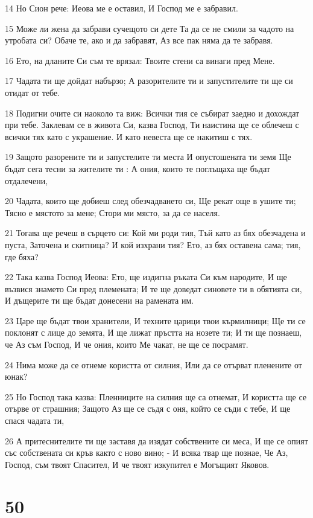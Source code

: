 \par 14 Но Сион рече: Иеова ме е оставил, И Господ ме е забравил.
\par 15 Може ли жена да забрави сучещото си дете Та да се не смили за чадото на утробата си? Обаче те, ако и да забравят, Аз все пак няма да те забравя.
\par 16 Ето, на дланите Си съм те врязал: Твоите стени са винаги пред Мене.
\par 17 Чадата ти ще дойдат набързо; А разорителите ти и запустителите ти ще си отидат от тебе.
\par 18 Подигни очите си наоколо та виж: Всички тия се събират заедно и дохождат при тебе. Заклевам се в живота Си, казва Господ, Ти наистина ще се облечеш с всички тях като с украшение. И като невеста ще се накитиш с тях.
\par 19 Защото разорените ти и запустелите ти места И опустошената ти земя Ще бъдат сега тесни за жителите ти : А ония, които те поглъщаха ще бъдат отдалечени,
\par 20 Чадата, които ще добиеш след обезчадването си, Ще рекат още в ушите ти; Тясно е мястото за мене; Стори ми място, за да се населя.
\par 21 Тогава ще речеш в сърцето си: Кой ми роди тия, Тъй като аз бях обезчадена и пуста, Заточена и скитница? И кой изхрани тия? Ето, аз бях оставена сама; тия, где бяха?
\par 22 Така казва Господ Иеова: Ето, ще издигна ръката Си към народите, И ще възвися знамето Си пред племената; И те ще доведат синовете ти в обятията си, И дъщерите ти ще бъдат донесени на рамената им.
\par 23 Царе ще бъдат твои хранители, И техните царици твои кърмилници; Ще ти се поклонят с лице до земята, И ще лижат пръстта на нозете ти; И ти ще познаеш, че Аз съм Господ, И че ония, които Ме чакат, не ще се посрамят.
\par 24 Нима може да се отнеме користта от силния, Или да се отърват пленените от юнак?
\par 25 Но Господ така казва: Пленниците на силния ще са отнемат, И користта ще се отърве от страшния; Защото Аз ще се съдя с оня, който се съди с тебе, И ще спася чадата ти,
\par 26 А притеснителите ти ще заставя да изядат собствените си меса, И ще се опият със собствената си кръв както с ново вино; - И всяка твар ще познае, Че Аз, Господ, съм твоят Спасител, И че твоят изкупител е Могъщият Яковов.

\chapter{50}

